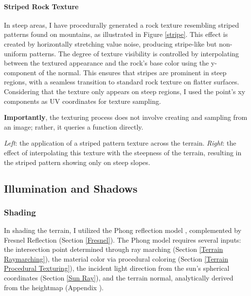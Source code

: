 \paragraph{Striped Rock Texture}
In steep areas, I have procedurally generated a rock texture resembling striped patterns found on mountains, as illustrated in Figure \ref{stripe}. This effect is created by horizontally stretching value noise, producing stripe-like but non-uniform patterns. The degree of texture visibility is controlled by interpolating between the textured appearance and the rock's base color using the y-component of the normal. This ensures that stripes are prominent in steep regions, with a seamless transition to standard rock texture on flatter surfaces. Considering that the texture only appears on steep regions, I used the point's xy components as UV coordinates for texture sampling. 

\textbf{Importantly}, the texturing process does not involve creating and sampling from an image; rather, it queries a function directly.

{\textit{Left}: the application of a striped pattern texture across the terrain. \textit{Right}: the effect of interpolating this texture with the steepness of the terrain, resulting in the striped pattern showing only on steep slopes.}



\subsection{Illumination and Shadows}

\subsubsection{Shading}
\label{Terrain Shading}

In shading the terrain, I utilized the Phong reflection model \cite{phong_illumination_1975}, complemented by Fresnel Reflection (Section \ref{Fresnel}). The Phong model requires several inputs: the intersection point determined through ray marching (Section \ref{Terrain Raymarching}), the material color via procedural coloring (Section \ref{Terrain Procedural Texturing}), the incident light direction from the sun's spherical coordinates (Section \ref{Sun Ray}), and the terrain normal, analytically derived from the heightmap (Appendix ).


